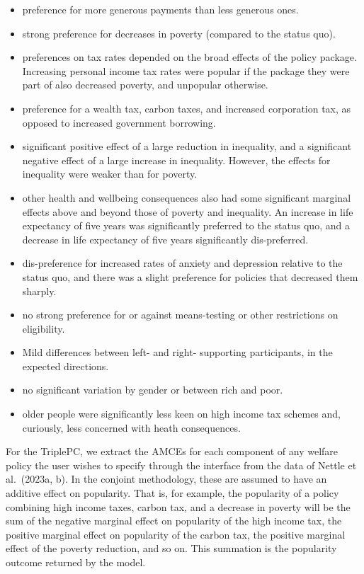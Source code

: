 \documentclass[
  letterpaper,
  DIV=11,
  numbers=noendperiod]{scrartcl}
\providecommand{\tightlist}{%
  \setlength{\itemsep}{0pt}\setlength{\parskip}{0pt}}\usepackage{longtable,booktabs,array}
\begin{document}
\begin{itemize}
\tightlist
\item
  preference for more generous payments than less generous ones.
\item
  strong preference for decreases in poverty (compared to the status
  quo).
\item
  preferences on tax rates depended on the broad effects of the policy
  package. Increasing personal income tax rates were popular if the
  package they were part of also decreased poverty, and unpopular
  otherwise.
\item
  preference for a wealth tax, carbon taxes, and increased corporation
  tax, as opposed to increased government borrowing.
\item
  significant positive effect of a large reduction in inequality, and a
  significant negative effect of a large increase in inequality.
  However, the effects for inequality were weaker than for poverty.
\item
  other health and wellbeing consequences also had some significant
  marginal effects above and beyond those of poverty and inequality. An
  increase in life expectancy of five years was significantly preferred
  to the status quo, and a decrease in life expectancy of five years
  significantly dis-preferred.
\item
  dis-preference for increased rates of anxiety and depression relative
  to the status quo, and there was a slight preference for policies that
  decreased them sharply.
\item
  no strong preference for or against means-testing or other
  restrictions on eligibility.
\item
  Mild differences between left- and right- supporting participants, in
  the expected directions.
\item
  no significant variation by gender or between rich and poor.
\item
  older people were significantly less keen on high income tax schemes
  and, curiously, less concerned with heath consequences.
\end{itemize}

For the TriplePC, we extract the AMCEs for each component of any welfare
policy the user wishes to specify through the interface from the data of
Nettle et al.~(2023a, b). In the conjoint methodology, these are assumed
to have an additive effect on popularity. That is, for example, the
popularity of a policy combining high income taxes, carbon tax, and a
decrease in poverty will be the sum of the negative marginal effect on
popularity of the high income tax, the positive marginal effect on
popularity of the carbon tax, the positive marginal effect of the
poverty reduction, and so on. This summation is the popularity outcome
returned by the model.
\end{document}
